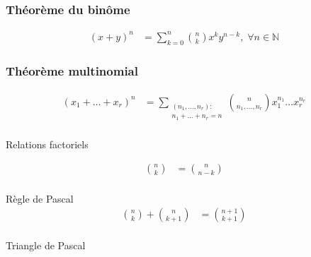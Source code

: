 \documentclass[10pt, french]{article}
\begin{document}
\begin{multicols*}{2}
\subsubsection*{Théorème du binôme}
\begin{align*}
	(x + y)^{n}
		&=	\sum_{k = 0}^{n} \binom{n}{k} x^{k} y^{n - k}, \; \forall n \in \mathds{N}	
\end{align*}

%
\subsubsection*{Théorème multinomial}
\begin{align*}
	(x_1 + \dots + x_r)^{n}
		&=	\sum_{\substack{(n_1, \dots, n_r): \\ n_1 + \dots + n_r = n}} \binom{n}{n_{1}, \dots, n_{r}} x_{1}^{n_{1}} \dots x_{r}^{n_{r}}	\\
\end{align*}

Relations factoriels

\begin{align*}
	\binom{n}{k}
		&=	\binom{n}{n - k}		\\
\end{align*}

Règle de Pascal
\begin{align*}
	\binom{n}{k} + \binom{n}{k + 1}
		&=	\binom{n + 1}{k + 1}		\\
\end{align*}

Triangle de Pascal

\begin{minipage}{0.4\linewidth}

\end{minipage}
\end{multicols*}
\end{document}
